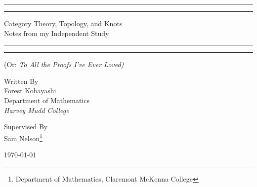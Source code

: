 \documentclass{fkbook}
\newcommand{\plogo}{\fbox{$\mathcal{FK}$}} %
\begin{document}
\pagestyle{plain}
\frontmatter
\begin{titlepage} %

  \centering\scshape

  \rule{\textwidth}{1pt}\vspace*{-\baselineskip}\vspace*{2pt}
  \rule{\textwidth}{0.4pt}

  \vspace{0.75\baselineskip} %

  {\LARGE Category Theory, Topology, and Knots\\}
  {\Large Notes from my Independent Study\\}

  \vspace{0.75\baselineskip} %

  \rule{\textwidth}{0.4pt}\vspace*{-\baselineskip}\vspace*{2.4pt}
  \rule{\textwidth}{1pt}

  \vspace{\baselineskip} %


  {\large (\normalfont Or: \itshape To All the Proofs I've Ever
    Loved)}

  \vspace*{12\baselineskip}


  {Written By\\}
  {\Large Forest Kobayashi\\} %
  \vspace{2\baselineskip}
  {Department of Mathematics\\}
  {\itshape Harvey Mudd College\\} %

  \vfill %


  {\small Supervised By\\}
  {Sam Nelson\footnote{Department of Mathematics, Claremont McKenna College}\\}
  \vspace{4\baselineskip}

  \plogo %

  \vspace{0.3\baselineskip} %

  {\large \normalfont \today} %


\end{titlepage}
\end{document}
